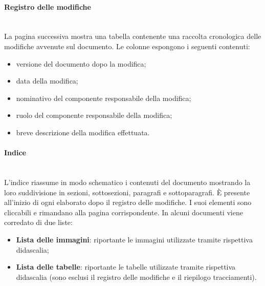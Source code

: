 	        \paragraph*{Registro delle modifiche}\mbox{}\\ [1mm]
	            La pagina successiva mostra una tabella contenente una raccolta cronologica delle modifiche avvenute sul documento.
	            Le colonne espongono i seguenti contenuti:
	            \begin{itemize}
	                \item versione del documento dopo la modifica;
	                \item data della modifica;
	                \item nominativo del componente responsabile della modifica;
	                \item ruolo del componente responsabile della modifica;
	                \item breve descrizione della modifica effettuata.
	            \end{itemize}
	        \paragraph*{Indice}\mbox{}\\ [1mm]
	            L'indice riassume in modo schematico i contenuti del documento mostrando la loro suddivisione in sezioni, sottosezioni, paragrafi e sottoparagrafi.
	            È presente all'inizio di ogni elaborato dopo il registro delle modifiche. I suoi elementi sono cliccabili e rimandano alla pagina
	            corrispondente. In alcuni documenti viene corredato di due liste:
	            \begin{itemize}
	                \item \textbf{Lista delle immagini}: riportante le immagini utilizzate tramite rispettiva didascalia;
	                \item \textbf{Lista delle tabelle}: riportante le tabelle utilizzate tramite rispettiva didascalia (sono esclusi il registro delle modifiche
	                                                    e il riepilogo tracciamenti).
	            \end{itemize}
